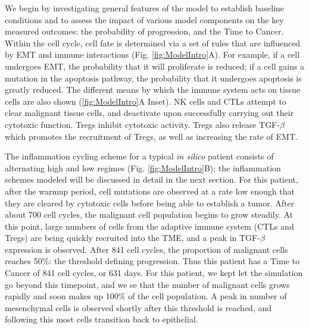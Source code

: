 \documentclass[11pt]{article}
\begin{document}
We begin by investigating general features of the model to establish baseline conditions and to assess the impact of various model components on the key measured outcomes: the probability of progression, and the Time to Cancer. 
Within the cell cycle, cell fate is determined via a set of rules that are influenced by EMT and immune interactions (Fig. \ref{fig:ModelIntro}A). For example, if a cell undergoes EMT, the probability that it will proliferate is reduced; if a cell gains a mutation in the apoptosis pathway, the probability that it undergoes apoptosis is greatly reduced.
The different means by which the immune system acts on tissue cells are also shown (\ref{fig:ModelIntro}A Inset). NK cells and CTLs attempt to clear malignant tissue cells, and deactivate upon successfully carrying out their cytotoxic function.
Tregs inhibit cytotoxic activity.
Tregs also release TGF-$\beta$ which promotes the recruitment of Tregs, as well as increasing the rate of EMT.
\par
The inflammation cycling scheme for a typical {\it in silico} patient consists of alternating high and low regimes (Fig. \ref{fig:ModelIntro}B); the inflammation schemes modeled will be discussed in detail in the next section.
For this patient, after the warmup period, cell mutations are observed at a rate low enough that they are cleared by cytotoxic cells before being able to establish a tumor.
After about 700 cell cycles, the malignant cell population begins to grow steadily.
At this point, large numbers of cells from the adaptive immune system (CTLs and Tregs) are being quickly recruited into the TME, and a peak in TGF-$\beta$ expression is observed.
After 841 cell cycles, the proportion of malignant cells reaches 50\%: the threshold defining progression.
Thus this patient has a Time to Cancer of 841 cell cycles, or 631 days.
For this patient, we kept let the simulation go beyond this timepoint, and we se that the number of malignant cells grows rapidly and soon makes up 100\% of the cell population.
A peak in number of mesenchymal cells is observed shortly after this threshold is reached, and following this most cells transition back to epithelial.
\end{document}
